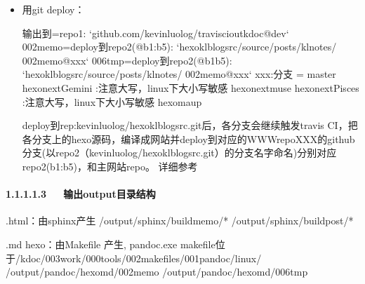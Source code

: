 \documentclass[letterpaper,12pt,english]{sphinxmanual}
\begin{document}
\begin{itemize}
\item {} 
用git deploy：

\begin{sphinxVerbatim}[commandchars=\\\{\}]
  
    
 
\end{sphinxVerbatim}

\begin{sphinxVerbatim}[commandchars=\\\{\}]
输出到=\PYGZgt{}repo1: `github.com/kevinluolog/travisci\PYGZus{}out\PYGZus{}kdoc@dev`
002memo=\PYGZgt{}deploy到repo2\PYGZhy{}(@b1:b5): `hexo\PYGZhy{}klblog\PYGZhy{}src/source/\PYGZus{}posts/kl\PYGZus{}notes/   002memo@xxx`
006tmp=\PYGZgt{}deploy到repo2\PYGZhy{}(@b1\PYGZhy{}b5): `hexo\PYGZhy{}klblog\PYGZhy{}src/source/\PYGZus{}posts/kl\PYGZus{}notes/   002memo@xxx`
xxx:分支 =
     master
     hexo\PYGZhy{}next\PYGZhy{}Gemini :注意大写，linux下大小写敏感
     hexo\PYGZhy{}next\PYGZhy{}muse
     hexo\PYGZhy{}next\PYGZhy{}Pisces :注意大写，linux下大小写敏感
     hexo\PYGZhy{}maup
\end{sphinxVerbatim}

deploy到rep:kevinluolog/hexo\sphinxhyphen{}klblog\sphinxhyphen{}src.git后，各分支会继续触发travis CI，把各分支上的hexo源码，编译成网站并deploy到对应的WWWrepoXXX的github分支(以repo2（kevinluolog/hexo\sphinxhyphen{}klblog\sphinxhyphen{}src.git）的分支名字命名)\sphinxhyphen{}分别对应repo2\sphinxhyphen{}(b1:b5)，和主网站repo。
详细参考 {\hyperref[\detokenize{001software/001install/001._u7f51_u7ad9/gitpage:kevinluolog-hexo-klblog-src-git-push}]{}}

\end{itemize}


\paragraph{1.1.1.1.3   输出output目录结构}
\label{\detokenize{001software/001install/001._u7f51_u7ad9/gitpage:output}}
\begin{sphinxVerbatim}[commandchars=\\\{\}]
.html：由sphinx产生
/output/sphinx/build\PYGZhy{}memo/*
/output/sphinx/build\PYGZhy{}post/*

.md hexo：由Makefile 产生, pandoc.exe
makefile位于/kdoc/003work/000tools/002makefiles/001pandoc/linux/
/output/pandoc/hexomd/002memo
/output/pandoc/hexomd/006tmp
\end{sphinxVerbatim}
\end{document}
